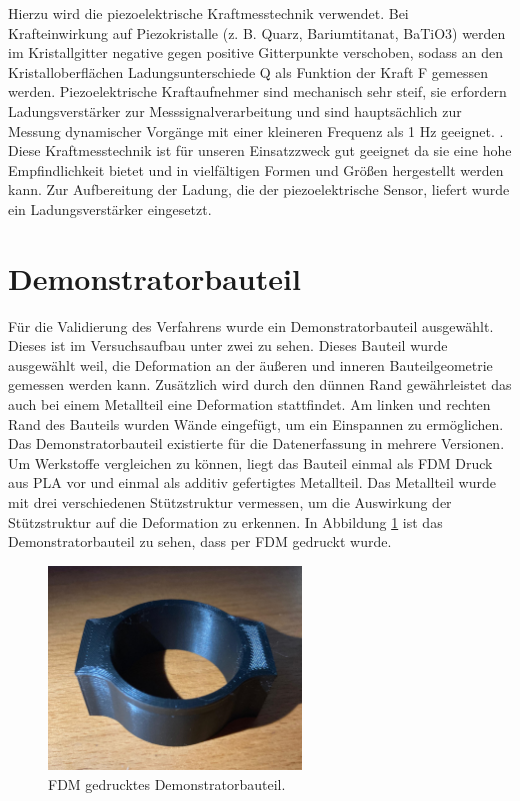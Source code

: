 Hierzu wird die piezoelektrische Kraftmesstechnik verwendet.
Bei Krafteinwirkung auf Piezokristalle (z. B. Quarz, Bariumtitanat, BaTiO3) 
werden im Kristallgitter negative gegen positive Gitterpunkte
verschoben, sodass an den Kristalloberflächen
Ladungsunterschiede Q als Funktion der Kraft F
gemessen werden.
Piezoelektrische Kraftaufnehmer sind mechanisch sehr steif, 
sie erfordern Ladungsverstärker
zur Messsignalverarbeitung und sind hauptsächlich zur Messung dynamischer Vorgänge
mit einer kleineren Frequenz als 1 Hz geeignet. \cite{Czichos.2020}. 
Diese Kraftmesstechnik ist 
für unseren Einsatzzweck gut geeignet da sie eine hohe Empfindlichkeit bietet 
und in vielfältigen Formen und Größen hergestellt werden kann. Zur Aufbereitung 
der Ladung, die der piezoelektrische Sensor, liefert wurde ein Ladungsverstärker 
eingesetzt.\cite{Schwartz.2006}

\section{Demonstratorbauteil} \label{demo_Bauteil}

Für die Validierung des Verfahrens wurde ein Demonstratorbauteil ausgewählt.
Dieses ist im Versuchsaufbau unter zwei zu sehen. Dieses Bauteil wurde ausgewählt 
weil, die Deformation an der äußeren und inneren Bauteilgeometrie gemessen werden kann.
Zusätzlich wird durch den dünnen Rand gewährleistet das auch bei einem Metallteil 
eine Deformation stattfindet. Am linken und rechten Rand des Bauteils wurden Wände 
eingefügt, um ein Einspannen zu ermöglichen.
Das Demonstratorbauteil existierte für die Datenerfassung in mehrere Versionen.
Um Werkstoffe vergleichen zu können, liegt das Bauteil einmal als FDM Druck aus PLA vor 
und einmal als additiv gefertigtes Metallteil.
Das Metallteil wurde mit drei verschiedenen Stützstruktur vermessen, um die Auswirkung 
der Stützstruktur auf die Deformation zu erkennen. In Abbildung \ref{fig:demofdm} ist 
das Demonstratorbauteil zu sehen, dass per FDM gedruckt wurde.

\begin{figure}[H]
    \centering
    \includegraphics[width=0.6\textwidth]{images/demo_fdm.jpg}
    \caption{FDM gedrucktes Demonstratorbauteil.}
    \label{fig:demofdm}
\end{figure}

